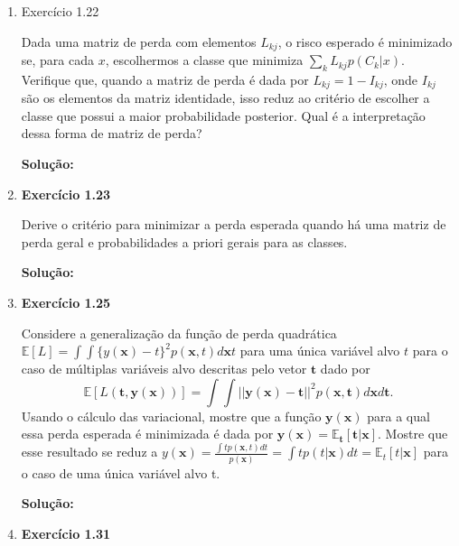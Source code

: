 \begin{enumerate}
\item Exercício 1.22 \par

Dada uma matriz de perda com elementos $L_{kj}$, o risco esperado é minimizado se, para cada $x$, escolhermos a classe que minimiza $\sum_{k}^{}L_{kj}p(C_k | x)$. Verifique que, quando a matriz de perda é dada por $L_{kj} = 1 - I_{kj}$, onde $I_{kj}$ são os elementos da matriz identidade, isso reduz ao critério de escolher a classe que possui a maior probabilidade posterior. Qual é a interpretação dessa forma de matriz de perda?
\newline \par
\textbf{Solução:}

\item \textbf{Exercício 1.23} \par

Derive o critério para minimizar a perda esperada quando há uma matriz de perda geral e probabilidades a priori gerais para as classes.
\newline \par
\textbf{Solução:}

\item \textbf{Exercício 1.25} \par

Considere a generalização da função de perda quadrática $\mathbb{E}[L] = \int \int \{y(\boldsymbol{x})-t\}^2p(\boldsymbol{x},t)d\boldsymbol{x}t$ para uma única variável alvo $t$ para o caso de múltiplas variáveis alvo descritas pelo vetor $\boldsymbol{t}$ dado por
\begin{equation*}
    \mathbb{E}[L(\boldsymbol{t},\boldsymbol{y}(\boldsymbol{x}))] = \int \int ||\boldsymbol{y}(\boldsymbol{x})-\boldsymbol{t}||^2p(\boldsymbol{x},\boldsymbol{t})d\boldsymbol{x}d\boldsymbol{t}.
\end{equation*}
Usando o cálculo das variacional, mostre que a função $\boldsymbol{y}(\boldsymbol{x})$ para a qual essa perda esperada é minimizada é dada por $\boldsymbol{y}(\boldsymbol{x}) = \mathbb{E}_{\boldsymbol{t}}[\boldsymbol{t}|\boldsymbol{x}]$. Mostre que esse resultado se reduz a $y(\boldsymbol{x}) = \frac{\int tp(\boldsymbol{x},t)dt}{p(\boldsymbol{x})} = \int tp(t|\boldsymbol{x}) dt = \mathbb{E}_t[t|\boldsymbol{x}]$ para o caso de uma única variável alvo t.
\newline \par
\textbf{Solução:}

\item \textbf{Exercício 1.31} \par


\end{enumerate}
